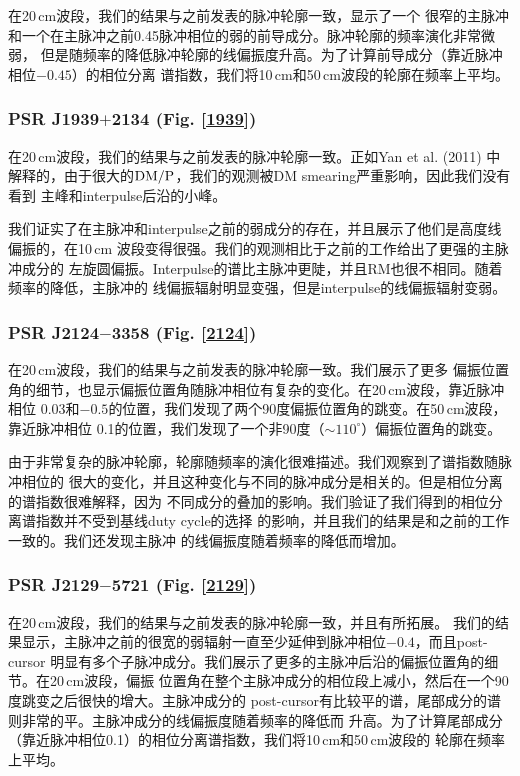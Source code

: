 在20\,cm波段，我们的结果与之前发表的脉冲轮廓一致\supercite{Ord04,Yan11a}，显示了一个
很窄的主脉冲和一个在主脉冲之前0.45脉冲相位的弱的前导成分。脉冲轮廓的频率演化非常微弱，
但是随频率的降低脉冲轮廓的线偏振度升高。为了计算前导成分（靠近脉冲相位$-0.45$）的相位分离
谱指数，我们将10\,cm和50\,cm波段的轮廓在频率上平均。

\subsubsection{PSR J1939$+$2134 (Fig. \ref{1939})}

在20\,cm波段，我们的结果与之前发表的脉冲轮廓一致\supercite{Yan11a}。正如Yan et al. (2011)
中解释的，由于很大的$\rm{DM}/P$，我们的观测被DM smearing严重影响，因此我们没有看到
主峰和interpulse后沿的小峰\supercite{Thorsett90,Stairs99,Ord04}。

我们证实了在主脉冲和interpulse之前的弱成分的存在，并且展示了他们是高度线偏振的，在10\,cm
波段变得很强。我们的观测相比于之前的工作\supercite{Yan11a}给出了更强的主脉冲成分的
左旋圆偏振。Interpulse的谱比主脉冲更陡，并且RM也很不相同。随着频率的降低，主脉冲的
线偏振辐射明显变强，但是interpulse的线偏振辐射变弱。


\subsubsection{PSR J2124$-$3358 (Fig. \ref{2124})}

在20\,cm波段，我们的结果与之前发表的脉冲轮廓一致\supercite{Yan11a}。我们展示了更多
偏振位置角的细节，也显示偏振位置角随脉冲相位有复杂的变化。在20\,cm波段，靠近脉冲相位
0.03和$-0.5$的位置，我们发现了两个90度偏振位置角的跳变。在50\,cm波段，靠近脉冲相位
0.1的位置，我们发现了一个非90度（$\sim110^{\circ}$）偏振位置角的跳变。

由于非常复杂的脉冲轮廓，轮廓随频率的演化很难描述。我们观察到了谱指数随脉冲相位的
很大的变化，并且这种变化与不同的脉冲成分是相关的。但是相位分离的谱指数很难解释，因为
不同成分的叠加的影响。我们验证了我们得到的相位分离谱指数并不受到基线duty cycle的选择
的影响，并且我们的结果是和之前的工作一致的\supercite{Manchester04}。我们还发现主脉冲
的线偏振度随着频率的降低而增加。

\subsubsection{PSR J2129$-$5721 (Fig. \ref{2129})}

在20\,cm波段，我们的结果与之前发表的脉冲轮廓一致，并且有所拓展\supercite{Yan11a}。
我们的结果显示，主脉冲之前的很宽的弱辐射一直至少延伸到脉冲相位$-0.4$，而且post-cursor
明显有多个子脉冲成分。我们展示了更多的主脉冲后沿的偏振位置角的细节。在20\,cm波段，偏振
位置角在整个主脉冲成分的相位段上减小，然后在一个90度跳变之后很快的增大。主脉冲成分的
post-cursor有比较平的谱，尾部成分的谱则非常的平。主脉冲成分的线偏振度随着频率的降低而
升高。为了计算尾部成分（靠近脉冲相位0.1）的相位分离谱指数，我们将10\,cm和50\,cm波段的
轮廓在频率上平均。

